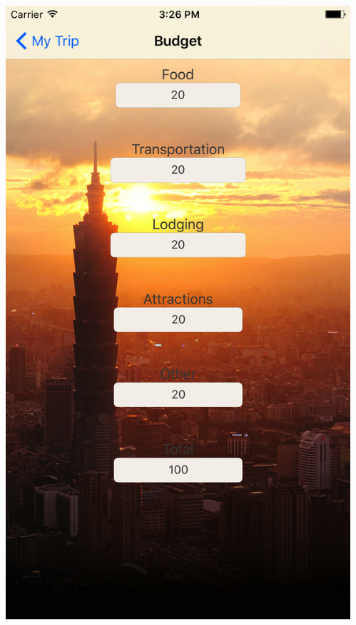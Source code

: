 \documentclass{beamer}
\begin{document}
\begin{frame}
\begin{columns}
\begin{column}{0.3\textwidth}
\begin{center}
        \end{center}
    \end{column}
    \begin{column}{0.3\textwidth}  %
        \begin{center}
            \includegraphics[scale=0.08]{budget}
        \end{center}
    \end{column}
\end{columns}
\end{frame}
\end{document}

